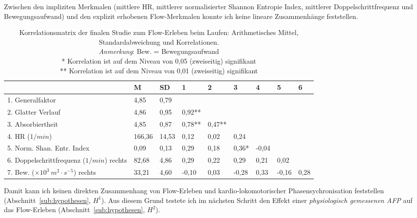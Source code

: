 Zwischen den impliziten Merkmalen (mittlere \ac{HR}, mittlerer normalisierter Shannon Entropie Index, mittlerer Doppelschrittfrequenz und Bewegungsaufwand) und den explizit erhobenen Flow-Merkmalen konnte ich keine lineare Zusammenhänge feststellen.

\begin{sidewaystable}
\centering
	\caption[Korrelationsmatrix (Finale Studie: Laufen).]{Korrelationsmatrix der finalen Studie zum Flow-Erleben beim Laufen: Arithmetisches Mittel, Standardabweichung und Korrelationen. \\ \hspace{\textwidth}\emph{Anmerkung}: Bew. = Bewegungsaufwand \\ \hspace{\textwidth}* Korrelation ist auf dem Niveau von 0,05 (zweiseitig) signifikant \\ \hspace{\textwidth}** Korrelation ist auf dem Niveau von 0,01 (zweiseitig) signifikant}
	\label{tab:korrelationen_3}
\begin{tabular}{lxxxxxxxx}
 \toprule
 & M & SD & 1 & 2 & 3 & 4 & 5 & 6 \\ 
 . Generalfaktor & 4,85 & 0,79 & & & & & & \\ 
 2. Glatter Verlauf & 4,86 & 0,95 & 0,92** & & & & & \\ 
 3. Absorbiertheit & 4,85 & 0,87 & 0,78** & 0,47** & & & & \\ 
 4. HR ($1/min$) & 166,36 & 14,53 & 0,12 & 0,02 & 0,24 & & & \\ 
 5. Norm. Shan. Entr. Index & 0,09 & 0,13 & 0,29 & 0,18 & 0,36* & -0,04 & & \\ 
 6. Doppelschrittfrequenz ($1/min$) rechts & 82,68 & 4,86 & 0,29 & 0,22 & 0,29 & 0,21 & 0,02 & \\ 
 7. Bew. ($\times 10^3 \: m^2 \cdot s^{-5}$) rechts & 33,21 & 4,60 & -0,10 & 0,03 & -0,28 & 0,33 & -0,16 & 0,28 \\ 
 \bottomrule
\end{tabular}
\end{sidewaystable}

Damit kann ich keinen direkten Zusammenhang von Flow-Erleben und kardio-lokomotorischer Phasensychronisation feststellen (Abschnitt~\ref{sub:hypothesen}, $H^1$). Aus diesem Grund testete ich im nächsten Schritt den Effekt einer \emph{physiologisch gemessenen \ac{AFP}} auf das Flow-Erleben (Abschnitt~\ref{sub:hypothesen}, $H^2$).


